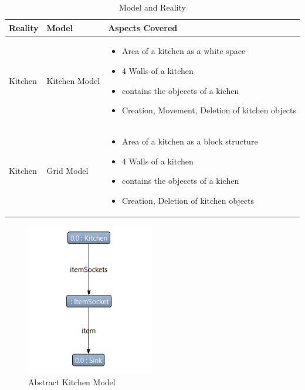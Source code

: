 \begin{table}
	\centering	
	\begin{tabular}{|p{3cm}|p{3cm}|p{9cm}|}
		\hline
		\rowcolor[gray]{.8}	
		\textbf{Reality} & \textbf{Model} & \textbf{Aspects Covered} \\
		\hline
		Kitchen & Kitchen Model & 
		\begin{itemize}
			\item Area of a kitchen as a white space
			\item 4 Walls of a kitchen
			\item contains the objeccts of a kichen
			\item Creation, Movement, Deletion of kitchen objects
		\end{itemize}\\
		\hline
		Kitchen & Grid Model & 
		\begin{itemize}
			\item Area of a kitchen as a block structure
			\item 4 Walls of a kitchen
			\item contains the objeccts of a kichen
			\item Creation, Deletion of kitchen objects
		\end{itemize}\\
		\hline					
		
	\end{tabular}
	\label{tab:Model_Reality}
	\caption{Model and Reality}
\end{table}

\begin{figure}
	\includegraphics[width=0.5\textwidth]{figures/KitchenModel_Abstract}
	\caption{Abstract Kitchen Model}
	\label{fig:Abstract_KitchenModel}
\end{figure}

